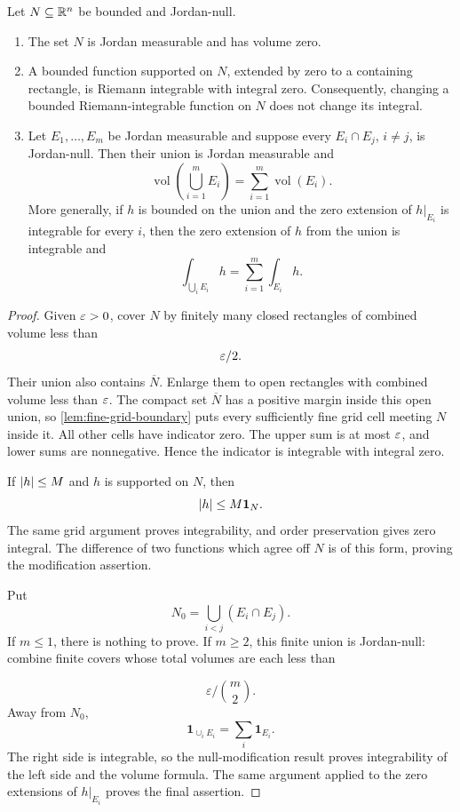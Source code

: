 \begin{proposition}
\label{prop:jordan-null-additivity}
Let \(N\subseteq\mathbb{R}^n\) be bounded and Jordan-null.
\begin{enumerate}
\item The set \(N\) is Jordan measurable and has volume zero.
\item A bounded function supported on \(N\), extended by zero to a containing
rectangle, is Riemann integrable with integral zero.  Consequently, changing
a bounded Riemann-integrable function on \(N\) does not change its integral.
\item Let \(E_1,\ldots,E_m\) be Jordan measurable and suppose every
\(E_i\cap E_j\), \(i\ne j\), is Jordan-null.  Then their union is Jordan
measurable and
\[
\operatorname{vol}\left(\bigcup_{i=1}^{m}E_i\right)
=
\sum_{i=1}^{m}\operatorname{vol}(E_i).
\]
More generally, if \(h\) is bounded on the union and the zero extension of
\(h|_{E_i}\) is integrable for every \(i\), then the zero extension of \(h\)
from the union is integrable and
\[
\int_{\bigcup_iE_i}h
=
\sum_{i=1}^{m}\int_{E_i}h.
\]
\end{enumerate}
\end{proposition}
\begin{proof}
Given $\varepsilon>0$, cover $N$ by finitely many closed rectangles of
combined volume less than
\[
\varepsilon/2.
\]
 Their union also contains
$\overline N$. Enlarge them to open rectangles with combined volume
less than $\varepsilon$. The compact set $\overline N$ has a positive margin
inside this open union, so \cref{lem:fine-grid-boundary} puts every
sufficiently fine grid cell meeting $N$ inside it. All other cells have
indicator zero. The upper sum is at most $\varepsilon$, and lower sums are
nonnegative. Hence the indicator is integrable with integral zero.

If \(\lvert h\rvert\leq M\) and \(h\) is supported on \(N\), then
\[
\lvert h\rvert\leq M\mathbf1_N.
\]
The same grid argument proves integrability, and order preservation gives
zero integral.  The difference of two functions which agree off \(N\) is of
this form, proving the modification assertion.

Put
\[
N_0=\bigcup_{i<j}(E_i\cap E_j).
\]
If \(m\leq1\), there is nothing to prove.  If \(m\geq2\), this finite union
is Jordan-null: combine finite covers whose total volumes are each less than

\[
\varepsilon/\binom m2.
\]
  Away from \(N_0\),
\[
\mathbf1_{\cup_iE_i}=\sum_i\mathbf1_{E_i}.
\]
The right side is integrable, so the null-modification result proves
integrability of the left side and the volume formula.  The same argument
applied to the zero extensions of \(h|_{E_i}\) proves the final assertion.
\end{proof}

